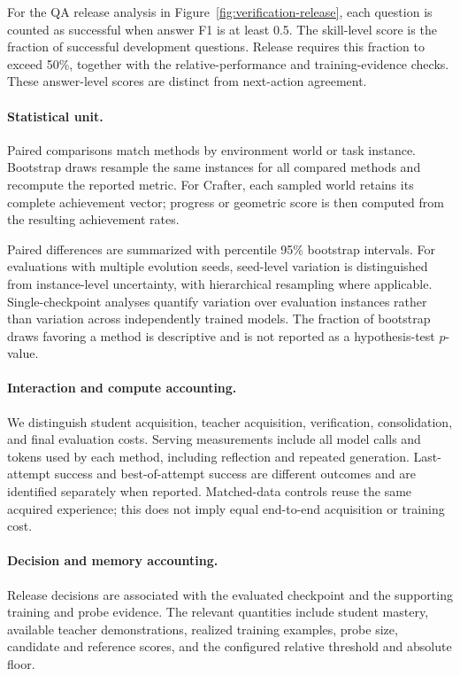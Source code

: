 For the QA release analysis in
Figure~\ref{fig:verification-release}, each question is counted
as successful when answer F1 is at least 0.5. The skill-level
score is the fraction of successful development questions.
Release requires this fraction to exceed 50\%, together with
the relative-performance and training-evidence checks.
These answer-level scores are distinct from next-action
agreement.


\paragraph{Statistical unit.}
Paired comparisons match methods by environment world or
task instance. Bootstrap draws resample the same instances
for all compared methods and recompute the reported metric.
For Crafter, each sampled world retains its complete
achievement vector; progress or geometric score is then
computed from the resulting achievement rates.

Paired differences are summarized with percentile 95\%
bootstrap intervals. For evaluations with multiple evolution
seeds, seed-level variation is distinguished from
instance-level uncertainty, with hierarchical resampling
where applicable. Single-checkpoint analyses quantify
variation over evaluation instances rather than variation
across independently trained models. The fraction of
bootstrap draws favoring a method is descriptive and is
not reported as a hypothesis-test $p$-value.

\paragraph{Interaction and compute accounting.}
We distinguish student acquisition, teacher acquisition,
verification, consolidation, and final evaluation costs.
Serving measurements include all model calls and tokens
used by each method, including reflection and repeated
generation. Last-attempt success and best-of-attempt success
are different outcomes and are identified separately when
reported. Matched-data controls reuse the same acquired
experience; this does not imply equal end-to-end acquisition
or training cost.

\paragraph{Decision and memory accounting.}
Release decisions are associated with the evaluated
checkpoint and the supporting training and probe evidence.
The relevant quantities include student mastery, available
teacher demonstrations, realized training examples, probe
size, candidate and reference scores, and the configured
relative threshold and absolute floor.

